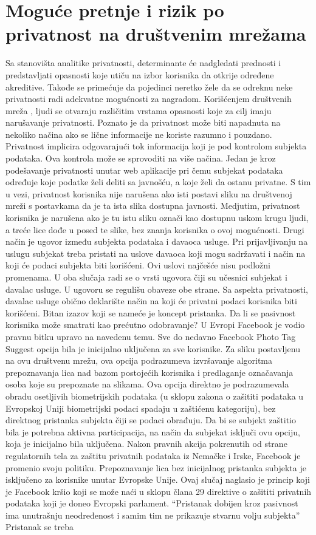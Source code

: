 \documentclass[a4paper]{article}
\begin{document}
\section{Moguće pretnje i rizik po privatnost na društvenim  mrežama }
Sa stanovišta analitike privatnosti, determinante će nadgledati prednosti i predstavljati opasnosti koje utiču na izbor korisnika da otkrije određene  akreditive. Takođe se primećuje da pojedinci neretko žele da se  odreknu neke privatnosti radi adekvatne mogućnosti za nagradom. Korišćenjem društvenih mreža \cite{Patrick}, ljudi se otvaraju različitim vrstama opasnosti koje za cilj imaju narušavanje privatnosti. Poznato je da privatnost može biti napadnuta na nekoliko načina  ako se lične informacije ne koriste razumno  i pouzdano. Privatnost implicira odgovarajući tok informacija koji je pod kontrolom subjekta podataka. Ova kontrola može se sprovoditi na više načina. Jedan je kroz podešavanje privatnosti unutar web aplikacije pri čemu subjekat podataka određuje koje podatke želi deliti sa javnošću, a koje želi da ostanu privatne. S tim u vezi, privatnost korisnika nije narušena ako isti postavi sliku na društvenoj mreži s postavkama da je ta ista slika dostupna javnosti. Medjutim, privatnost korisnika je narušena ako je tu istu sliku označi kao dostupnu uskom krugu ljudi, a treće lice dođe u posed te slike, bez znanja korisnika o ovoj mogućnosti. Drugi način je ugovor između subjekta podataka i davaoca usluge. Pri prijavljivanju na uslugu subjekat treba pristati na uslove davaoca koji mogu sadržavati i način na koji će podaci subjekta biti korišćeni. Ovi uslovi najčešće nisu podložni promenama. U oba slučaja radi se o vrsti ugovora čiji su učesnici subjekat i davalac usluge. U ugovoru se regulišu obaveze obe strane. Sa aspekta privatnosti, davalac usluge obično deklarište način na koji će privatni podaci korisnika biti korišćeni. Bitan izazov koji se nameće je koncept pristanka. Da li se pasivnost korisnika može smatrati kao prećutno odobravanje? U Evropi Facebook je vodio pravnu bitku upravo na navedenu temu. Sve do nedavno Facebook Photo Tag Suggest opcija bila je inicijalno uključena za sve korisnike. Za sliku postavljenu na ovu društvenu mrežu, ova opcija podrazumeva izvršavanje algoritma prepoznavanja lica nad bazom postojećih korisnika i predlaganje označavanja osoba koje su prepoznate na slikama. Ova opcija direktno je podrazumevala obradu osetljivih biometrijskih podataka (u sklopu zakona o zašititi podataka u Evropskoj Uniji biometrijski podaci spadaju u zaštićenu kategoriju), bez direktnog pristanka subjekta čiji se podaci obrađuju. Da bi se subjekt zaštitio bila je potrebna aktivna participacija, na način da subjekat isključi ovu opciju, koja je inicijalno bila uključena. Nakon pravnih akcija pokrenutih od strane regulatornih tela za zaštitu privatnih podataka iz Nemačke i Irske, Facebook je promenio svoju politiku. Prepoznavanje lica bez inicijalnog pristanka subjekta je isključeno za korisnike unutar Evropske Unije. Ovaj slučaj naglasio je princip koji je Facebook kršio koji se može naći u sklopu člana 29 direktive o zašititi privatnih podataka koji je doneo Evropski parlament. “Pristanak dobijen kroz pasivnost ima unutrašnju neodređenost i samim tim ne prikazuje stvarnu volju subjekta”\cite{EU} Pristanak se treba 
\end{document}
